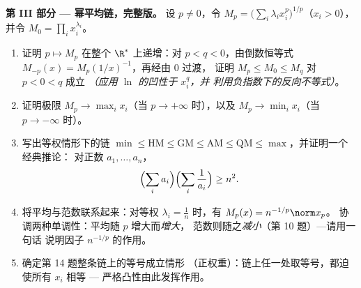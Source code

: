 \begin{problem}
\medskip
\noindent\textbf{第 III 部分 --- 幂平均链，完整版。}
设 $p \neq 0$，令 $M_p = \bigl(\sum_i\lambda_i
x_i^p\bigr)^{1/p}$（$x_i > 0$），并令 $M_0 = \prod_i
x_i^{\lambda_i}$。
\begin{enumerate}[resume]
  \item 证明 $p \mapsto M_p$ 在整个
        $\R^*$ 上递增：对 $p < q < 0$，由倒数恒等式
        $M_{-p}(x) = M_p(1/x)^{-1}$，再经由 $0$ 过渡，
        证明 $M_p \leq M_0 \leq M_q$ 对 $p < 0 < q$ 成立
        \emph{（应用 $\ln$ 的凹性于 $x_i^q$，并
        利用负指数下的反向不等式）}。
  \item 证明极限 $M_p \to \max_i x_i$（当 $p \to
        +\infty$ 时），以及 $M_p \to \min_i x_i$（当 $p \to -\infty$ 时）。
  \item 写出等权情形下的链 $\min \leq \mathrm{HM} \leq
        \mathrm{GM} \leq \mathrm{AM} \leq \mathrm{QM} \leq
        \max$，并证明一个经典推论：
        对正数 $a_1, \dots, a_n$，
        \[
        \Bigl(\sum_i a_i\Bigr)\Bigl(\sum_i\frac1{a_i}\Bigr)
        \geq n^2 .
        \]
  \item 将平均与范数联系起来：对等权 $\lambda_i =
        \frac1n$ 时，有 $M_p(x) = n^{-1/p}\norm x_p$。
        协调两种单调性：平均随 $p$ 增大而\emph{增大}，
        范数则随之\emph{减小}（第 10 题）---请用一句话
        说明因子 $n^{-1/p}$ 的作用。
  \item 确定第 14 题整条链上的等号成立情形
        （正权重）：链上任一处取等号，都迫使所有 $x_i$
        相等 --- 严格凸性由此发挥作用。
\end{enumerate}


\end{problem}
